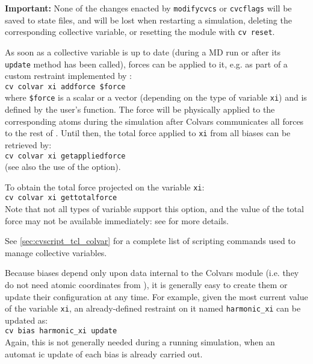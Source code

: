 {\textbf{Important:} None of the changes enacted by \texttt{modifycvcs} or \texttt{cvcflags} will be saved to state files, and will be lost when restarting a simulation, deleting the corresponding collective variable, or resetting the module with  \texttt{cv reset}.


As soon as a collective variable is up to date (during a MD run or after its \texttt{update} method has been called), forces can be applied to it, e.g.{} as part of a custom restraint implemented by :\\
\noindent\texttt{cv colvar xi addforce \$force}\\
\noindent{}where \texttt{\$force} is a scalar or a vector (depending on the type of variable \texttt{xi}) and is defined by the user's function.
The force will be physically applied to the corresponding atoms during the simulation after Colvars communicates all forces to the rest of \MDENGINE{}.
Until then, the total force applied to \texttt{xi} from all biases can be retrieved by:\\
\noindent\texttt{cv colvar xi getappliedforce}\\
\noindent{}(see also the use of the  option).

To obtain the total force projected on the variable \texttt{xi}:\\
\noindent\texttt{cv colvar xi gettotalforce}\\
\noindent{}Note that not all types of variable support this option, and the value of the total force may not be available immediately: see  for more details.

See \ref{sec:cvscript_tcl_colvar} for a complete list of scripting commands used to manage collective variables.



Because biases depend only upon data internal to the Colvars module (i.e.{} they do not need atomic coordinates from \MDENGINE{}), it is generally easy to create them or update their configuration at any time.
For example, given the most current value of the variable \texttt{xi}, an already-defined restraint on it named \texttt{harmonic\_xi} can be updated as:\\
\noindent\texttt{cv bias harmonic\_xi update}\\
Again, this is not generally needed during a running simulation, when an automat
ic update of each bias is already carried out.

}
